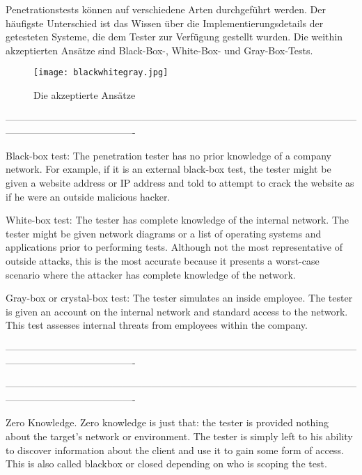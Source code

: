 Penetrationstests können auf verschiedene Arten durchgeführt werden. Der häufigste Unterschied ist das Wissen über die Implementierungsdetails der getesteten Systeme, die dem Tester zur Verfügung gestellt wurden. Die weithin akzeptierten Ansätze sind Black-Box-, White-Box- und Gray-Box-Tests.

\begin{figure}[h]
	\centering
	\texttt{[image: blackwhitegray.jpg]}
	\caption{Die akzeptierte Ansätze\cite{bwgtesting16}}
\end{figure}

----------------------------------------------------------------------------------------------------------------------------------------------------

Black-box test: The penetration tester has no prior knowledge of a company network. For example, if it is an external black-box test, the tester might be given a website address or IP address and told to attempt to crack the website as if he were an outside malicious hacker.

White-box test: The tester has complete knowledge of the internal network. The tester might be given network diagrams or a list of operating systems and applications prior to performing tests. Although not the most representative of outside attacks, this is the most accurate because it presents a worst-case scenario where the attacker has complete knowledge of the network.

Gray-box or crystal-box test: The tester simulates an inside employee. The tester is given an account on the internal network and standard access to the network. This test assesses internal threats from employees within the company.

\cite{whitaker2005penetration}

----------------------------------------------------------------------------------------------------------------------------------------------------


----------------------------------------------------------------------------------------------------------------------------------------------------

Zero Knowledge. Zero knowledge is just that: the tester is provided nothing
about the target’s network or environment. The tester is simply left
to his ability to discover information about the client and use it to gain
some form of access. This is also called blackbox or closed depending
on who is scoping the test.

